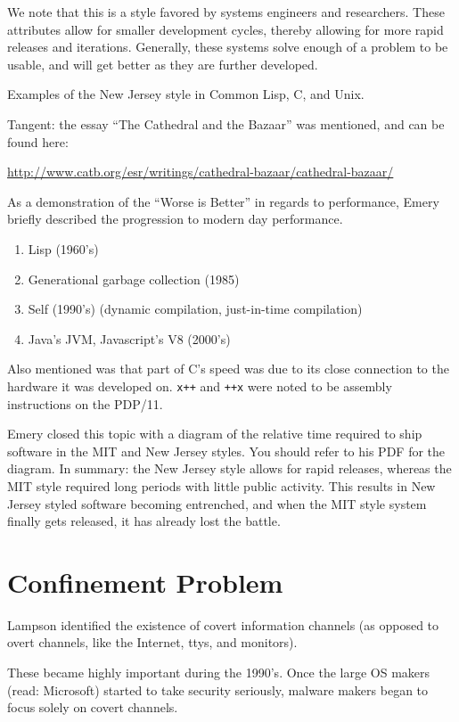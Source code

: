 \documentclass[twoside]{article}
\begin{document}
We note that this is a style favored by systems engineers and researchers. These attributes allow for smaller development cycles, thereby allowing for more rapid releases and iterations. Generally, these systems solve enough of a problem to be usable, and will get better as they are further developed.

Examples of the New Jersey style in Common Lisp, C, and Unix.

Tangent: the essay ``The Cathedral and the Bazaar'' was mentioned, and can be found here:

\hyperref[The Cathedral and the Bazaar]{http://www.catb.org/esr/writings/cathedral-bazaar/cathedral-bazaar/}

As a demonstration of the ``Worse is Better'' in regards to performance, Emery briefly described the progression to modern day performance.

\begin{enumerate}
\item Lisp (1960's)
\item Generational garbage collection (1985)
\item Self (1990's) (dynamic compilation, just-in-time compilation)
\item Java's JVM, Javascript's V8 (2000's)
\end{enumerate}

Also mentioned was that part of C's speed was due to its close connection to the hardware it was developed on. \texttt{x++} and \texttt{++x} were noted to be assembly instructions on the PDP/11.

Emery closed this topic with a diagram of the relative time required to ship software in the MIT and New Jersey styles. You should refer to his PDF for the diagram. In summary: the New Jersey style allows for rapid releases, whereas the MIT style required long periods with little public activity. This results in New Jersey styled software becoming entrenched, and when the MIT style system finally gets released, it has already lost the battle.

\section{Confinement Problem}

Lampson identified the existence of covert information channels (as opposed to overt channels, like the Internet, ttys, and monitors).

These became highly important during the 1990's. Once the large OS makers (read: Microsoft) started to take security seriously, malware makers began to focus solely on covert channels.
\end{document}
